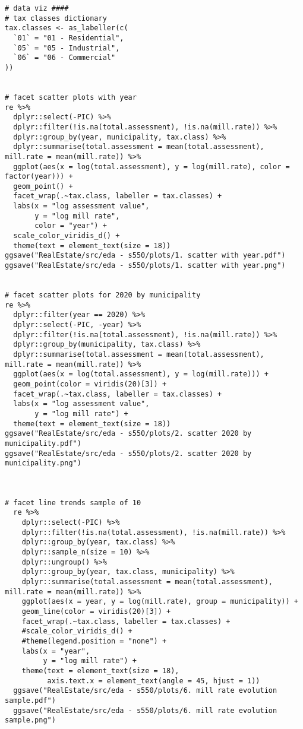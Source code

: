 \documentclass{article}
\begin{document}
\begin{lstlisting}[style=R, caption={Code used for the exploratory data analysis.}, captionpos=b]
# data viz ####
# tax classes dictionary
tax.classes <- as_labeller(c(
  `01` = "01 - Residential",
  `05` = "05 - Industrial",
  `06` = "06 - Commercial"
))


# facet scatter plots with year
re %>% 
  dplyr::select(-PIC) %>% 
  dplyr::filter(!is.na(total.assessment), !is.na(mill.rate)) %>% 
  dplyr::group_by(year, municipality, tax.class) %>% 
  dplyr::summarise(total.assessment = mean(total.assessment), mill.rate = mean(mill.rate)) %>% 
  ggplot(aes(x = log(total.assessment), y = log(mill.rate), color = factor(year))) +
  geom_point() +
  facet_wrap(.~tax.class, labeller = tax.classes) +
  labs(x = "log assessment value",
       y = "log mill rate",
       color = "year") +
  scale_color_viridis_d() +
  theme(text = element_text(size = 18))
ggsave("RealEstate/src/eda - s550/plots/1. scatter with year.pdf")
ggsave("RealEstate/src/eda - s550/plots/1. scatter with year.png")


# facet scatter plots for 2020 by municipality
re %>% 
  dplyr::filter(year == 2020) %>% 
  dplyr::select(-PIC, -year) %>% 
  dplyr::filter(!is.na(total.assessment), !is.na(mill.rate)) %>% 
  dplyr::group_by(municipality, tax.class) %>% 
  dplyr::summarise(total.assessment = mean(total.assessment), mill.rate = mean(mill.rate)) %>% 
  ggplot(aes(x = log(total.assessment), y = log(mill.rate))) +
  geom_point(color = viridis(20)[3]) +
  facet_wrap(.~tax.class, labeller = tax.classes) +
  labs(x = "log assessment value",
       y = "log mill rate") +
  theme(text = element_text(size = 18))
ggsave("RealEstate/src/eda - s550/plots/2. scatter 2020 by municipality.pdf")
ggsave("RealEstate/src/eda - s550/plots/2. scatter 2020 by municipality.png")



# facet line trends sample of 10
  re %>% 
    dplyr::select(-PIC) %>% 
    dplyr::filter(!is.na(total.assessment), !is.na(mill.rate)) %>% 
    dplyr::group_by(year, tax.class) %>% 
    dplyr::sample_n(size = 10) %>% 
    dplyr::ungroup() %>% 
    dplyr::group_by(year, tax.class, municipality) %>% 
    dplyr::summarise(total.assessment = mean(total.assessment), mill.rate = mean(mill.rate)) %>% 
    ggplot(aes(x = year, y = log(mill.rate), group = municipality)) +
    geom_line(color = viridis(20)[3]) +
    facet_wrap(.~tax.class, labeller = tax.classes) + 
    #scale_color_viridis_d() +
    #theme(legend.position = "none") +
    labs(x = "year",
         y = "log mill rate") +
    theme(text = element_text(size = 18),
          axis.text.x = element_text(angle = 45, hjust = 1))
  ggsave("RealEstate/src/eda - s550/plots/6. mill rate evolution sample.pdf")
  ggsave("RealEstate/src/eda - s550/plots/6. mill rate evolution sample.png")
  

\end{lstlisting}
\end{document}
